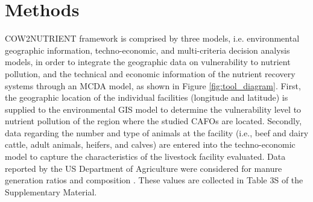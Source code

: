 \documentclass[authoryear]{elsarticle}
\begin{document}
\section{Methods}
COW2NUTRIENT framework is comprised by three models, i.e. environmental geographic information, techno-economic, and multi-criteria decision analysis
models, in order to integrate the geographic data on vulnerability to nutrient pollution, and the technical and economic information of the nutrient recovery systems through an MCDA model, as shown in Figure \ref{fig:tool_diagram}.
First, the geographic location of the individual facilities (longitude and latitude) is supplied to the environmental GIS model to determine the vulnerability level to nutrient pollution of the region where the studied CAFOs are located. Secondly, data regarding the number and type of animals at the facility (i.e., beef and dairy cattle, adult animals, heifers, and calves) are entered into the techno-economic model to capture the characteristics of the livestock facility evaluated. 
Data reported by the US Department of Agriculture
were considered for manure generation ratios \citep{Kellog2010} and composition 
\citep{USDAHandbook}. These values are collected in Table 3S of the Supplementary Material. 
\end{document}
